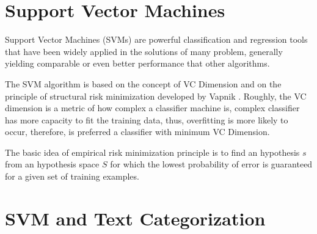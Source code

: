 
%




\section{Support Vector Machines}

Support Vector Machines (SVMs) \cite{Vapnik98} are powerful classification
and regression tools that have been widely applied in the solutions
of many problem, generally yielding comparable or even better performance
that other algorithms. 

The SVM algorithm is based on the concept of VC Dimension\cite{vapnik71uniform}
and on the principle of structural risk minimization developed by
Vapnik \cite{Vapnik99,vapnik71uniform}. Roughly, the VC dimension
is a metric of how complex a classifier machine is, complex classifier
has more capacity to fit the training data, thus, overfitting is more
likely to occur, therefore, is preferred a classifier with minimum
VC Dimension. 

The basic idea of empirical risk minimization principle is to find
an hypothesis $s$ from an hypothesis space $S$ for which the lowest
probability of error is guaranteed for a given set of training examples. 

\section{SVM and Text Categorization}

